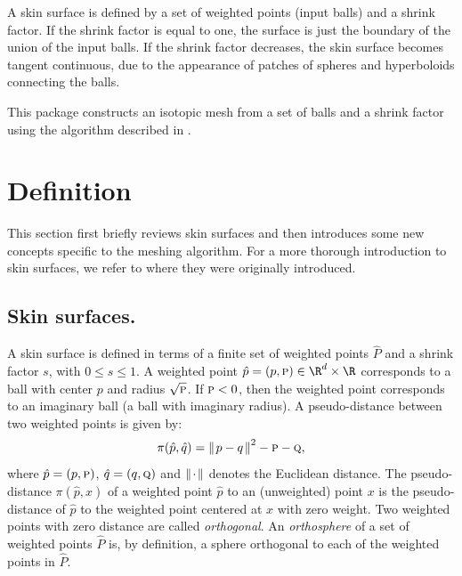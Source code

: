 A skin surface is defined by a set of weighted points (input
balls) and a shrink factor. If the shrink factor is equal to one, the
surface is just the boundary of the union of the input balls.  If the
shrink factor decreases, the skin surface becomes tangent continuous,
due to the appearance of patches of spheres and hyperboloids
connecting the balls.

This package constructs an isotopic mesh from a set of balls and a
shrink factor using the algorithm described in
\cite{cgal:kv-mssct-05}. 

\section{Definition}
\label{sec:skindefinition}
This section first briefly reviews skin surfaces and then introduces
some new concepts specific to the meshing algorithm. For a more
thorough introduction to skin surfaces, we refer to \cite{cgal:e-dssd-99}
where they were originally introduced.

\subsection{Skin surfaces.}
A skin surface is defined in terms of a finite set of weighted points
$\hat{P}$ and a shrink factor $s$, with $0\leq s\leq 1$. A
weighted point $\hat{p}=({p},\textsc{p})\in \R^d\times\R$
corresponds to a ball with center ${p}$ and radius
$\sqrt{\textsc{p}}$. If $\textsc{p}<0$, then the weighted point
corresponds to an imaginary ball (a ball with imaginary radius). A
pseudo-distance between two weighted points is given by:
\begin{equation}
\label{eq:dist}
  \pi(\hat{p},\hat{q}) = {\parallel\! {p} - {q} \!\parallel}^2
                               - \textsc{p} - \textsc{q},
\end{equation}
where $\hat{p}=({p},\textsc{p})$,
$\hat{q}=({q},\textsc{q})$ and ${\parallel\! \cdot \!\parallel}$ denotes the
Euclidean distance. The pseudo-distance $\pi(\hat{p},x)$ of a
weighted point $\hat{p}$ to an (unweighted) point $x$ is the
pseudo-distance of $\hat{p}$ to the weighted point centered at $x$
with zero weight.
Two weighted points with zero distance are called \emph{orthogonal}.
An \emph{orthosphere} of a set of weighted points $\hat{P}$ is,
by definition, a sphere orthogonal to each of the weighted points in
$\hat{P}$.

